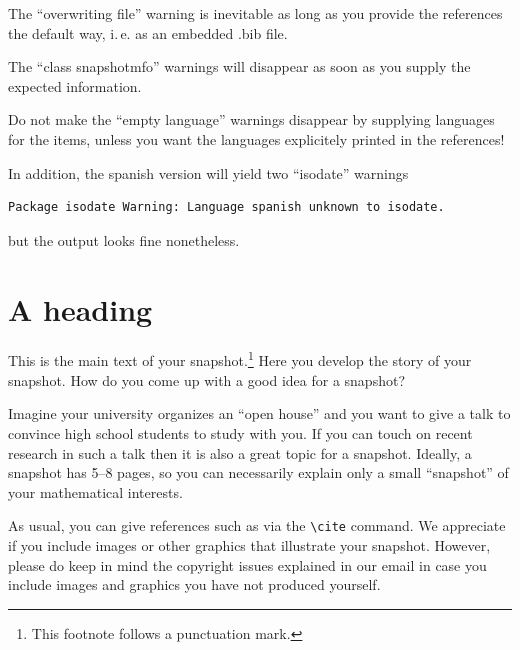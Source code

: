 \documentclass{snapshotmfo}
\begin{document}
The ``overwriting file'' warning is inevitable as long as you provide the references the default
way, i.\,e. as an embedded .bib file.

The ``class snapshotmfo'' warnings will disappear as soon as you supply the expected information.

Do not make the ``empty language'' warnings disappear by supplying languages for the items,
unless you want the languages explicitely printed in the references!

In addition, the spanish version will yield two ``isodate'' warnings
\begin{small}
\begin{verbatim}
Package isodate Warning: Language spanish unknown to isodate.
\end{verbatim}
\end{small}
but the output looks fine nonetheless.


\section{A heading}

This is the main text of your snapshot.\footnote{This footnote follows a punctuation mark.} Here you develop the story of your snapshot.
How do you come up with a good idea for a snapshot?

Imagine your university organizes an ``open house'' and you want to give a talk to convince high school students to study with you. If you can touch on recent research in such a talk then it is also a great topic for a snapshot. Ideally, a snapshot has 5--8 pages, so you can necessarily explain only a small ``snapshot'' of your mathematical interests.

As usual, you can give references such as \cite{knuth1984texbook, wikiMath, sample13, sample12, sample11, sample14, helfgott14} via the \verb+\cite+ command.
We appreciate if you include images or other graphics that illustrate your snapshot. However, please do keep in mind the copyright issues explained in our email in case you include images and graphics you have not produced yourself.
\end{document}
